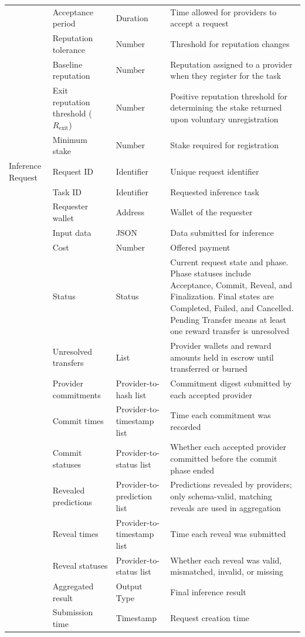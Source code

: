 \documentclass[12pt]{article}
\begin{document}
\begin{longtable}{p{} p{} p{} p{}}
 & Acceptance period & Duration & Time allowed for providers to accept a request\\
 & Reputation tolerance & Number & Threshold for reputation changes\\
 & Baseline reputation & Number & Reputation assigned to a provider when they register for the task\\
 & Exit reputation threshold ($R_{\text{exit}}$) & Number & Positive reputation threshold for determining the stake returned upon voluntary unregistration\\
 & Minimum stake & Number & Stake required for registration\\
Inference Request & Request ID & Identifier & Unique request identifier\\
 & Task ID & Identifier & Requested inference task\\
 & Requester wallet & Address & Wallet of the requester\\
 & Input data & JSON & Data submitted for inference\\
 & Cost & Number & Offered payment\\
 & Status & Status & Current request state and phase. Phase statuses include Acceptance, Commit, Reveal, and Finalization. Final states are Completed, Failed, and Cancelled. Pending Transfer means at least one reward transfer is unresolved\\
 & Unresolved transfers & List & Provider wallets and reward amounts held in escrow until transferred or burned\\
 & Provider commitments & Provider-to-hash list & Commitment digest submitted by each accepted provider\\
 & Commit times & Provider-to-timestamp list & Time each commitment was recorded\\
 & Commit statuses & Provider-to-status list & Whether each accepted provider committed before the commit phase ended\\
 & Revealed predictions & Provider-to-prediction list & Predictions revealed by providers; only schema-valid, matching reveals are used in aggregation\\
 & Reveal times & Provider-to-timestamp list & Time each reveal was submitted\\
 & Reveal statuses & Provider-to-status list & Whether each reveal was valid, mismatched, invalid, or missing\\
 & Aggregated result & Output Type & Final inference result\\
 & Submission time & Timestamp & Request creation time\\

\end{longtable}
\end{document}
